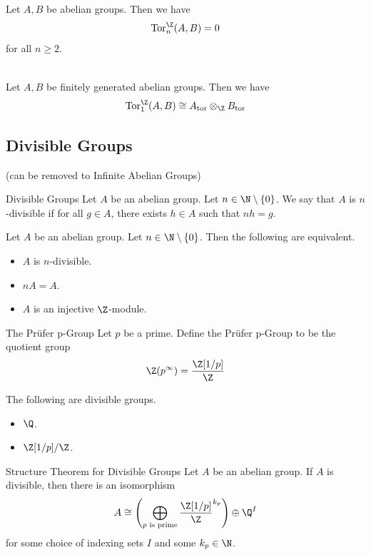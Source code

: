 \documentclass[a4paper]{article}
\begin{document}
\begin{prp}{}{}\\
Let $A,B$ be abelian groups. Then we have $$\text{Tor}_n^\Z(A,B)=0$$ for all $n\geq 2$. 
\end{prp}

\begin{prp}{}{}\\
Let $A,B$ be finitely generated abelian groups. Then we have $$\text{Tor}_1^\Z(A,B)\cong A_\text{tor}\otimes_\Z B_\text{tor}$$
\end{prp}

\subsection{Divisible Groups}
(can be removed to Infinite Abelian Groups)

\begin{defn}{Divisible Groups}{} Let $A$ be an abelian group. Let $n\in\N\setminus\{0\}$. We say that $A$ is $n$-divisible if for all $g\in A$, there exists $h\in A$ such that $nh=g$. 
\end{defn}

\begin{prp}{}{} Let $A$ be an abelian group. Let $n\in\N\setminus\{0\}$. Then the following are equivalent. 
\begin{itemize}
\item $A$ is $n$-divisible. 
\item $nA=A$. 
\item $A$ is an injective $\Z$-module. 
\end{itemize}
\end{prp}

\begin{defn}{The Prüfer p-Group}{} Let $p$ be a prime. Define the Prüfer p-Group to be the quotient group $$\Z(p^\infty)=\frac{\Z[1/p]}{\Z}$$
\end{defn}

\begin{eg}{}{} The following are divisible groups. 
\begin{itemize}
\item $\Q$. 
\item $\Z[1/p]/\Z$. 
\end{itemize}
\end{eg}

\begin{thm}{Structure Theorem for Divisible Groups}{} Let $A$ be an abelian group. If $A$ is divisible, then there is an isomorphism $$A\cong\left(\bigoplus_{p\text{ is prime}}\frac{\Z[1/p]}{\Z}^{k_p}\right)\oplus\Q^I$$ for some choice of indexing sets $I$ and some $k_p\in\N$. 
\end{thm}
\end{document}
